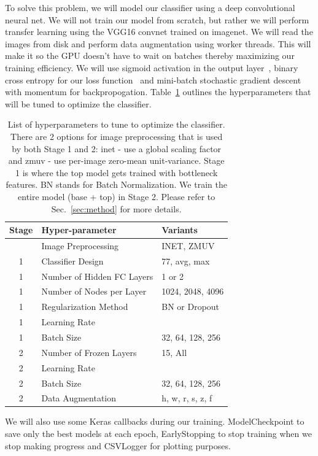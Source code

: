 \documentclass[12pt,journal,compsoc]{IEEEtran}
\begin{document}
To solve this problem, we will model our classifier using a deep convolutional neural net.  We will not train our model from scratch, but rather we will perform transfer learning using the VGG16 convnet trained on imagenet.  We will read the images from disk and perform data augmentation using worker threads.  This will make it so the GPU doesn't have to wait on batches thereby maximizing our training efficiency. We will use sigmoid activation in the output layer~\cite{Kurata:2016}, binary cross entropy for our loss function~\cite{deBoer2005} and mini-batch stochastic gradient descent with momentum for backpropogation. Table~\ref{tab:hyperparams} outlines the hyperparameters that will be tuned to optimize the classifier.
\begin{table}
\caption{List of hyperparameters to tune to optimize the classifier.  There are 2 options for image preprocessing that is used by both Stage 1 and 2: inet - use a global scaling factor and zmuv - use per-image zero-mean unit-variance.  Stage 1 is where the top model gets trained with bottleneck features. BN stands for Batch Normalization. We train the entire model (base + top) in Stage 2.  Please refer to Sec.~\ref{sec:method} for more details.}
\label{tab:hyperparams}
\begin{tabular}{cll}
\hline
Stage & Hyper-parameter & Variants \\
\hline
 & Image Preprocessing & INET, ZMUV \\
\hline
1 & Classifier Design & 77, avg, max \\
1 & Number of Hidden FC Layers & 1 or 2 \\
1 & Number of Nodes per Layer & 1024, 2048, 4096 \\
1 & Regularization Method & BN or Dropout \\
1 & Learning Rate & \\
1 & Batch Size & 32, 64, 128, 256\\
\hline
2 & Number of Frozen Layers & 15, All \\
2 & Learning Rate & \\
2 & Batch Size & 32, 64, 128, 256 \\
2 & Data Augmentation & h, w, r, s, z, f \\
\hline
\end{tabular}
\end{table}
We will also use some Keras callbacks during our training.  ModelCheckpoint to save only the best models at each epoch, EarlyStopping to stop training when we stop making progress and CSVLogger for plotting purposes.
\end{document}
